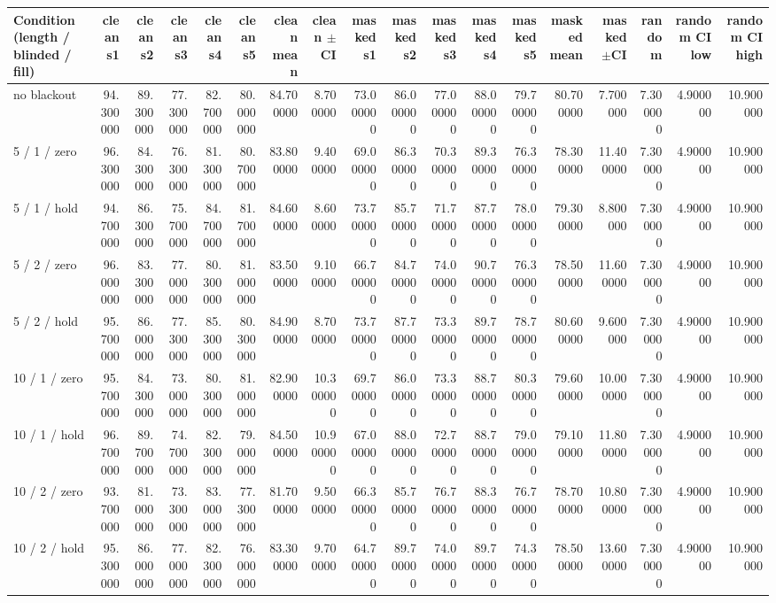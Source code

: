\begin{tabular}{lrrrrrrrrrrrrrrrrr}
\toprule
Condition (length / blinded / fill) & clean s1 & clean s2 & clean s3 & clean s4 & clean s5 & clean mean & clean $\pm$CI & masked s1 & masked s2 & masked s3 & masked s4 & masked s5 & masked mean & masked $\pm$CI & random & random CI low & random CI high \\
\midrule
no blackout & 94.300000 & 89.300000 & 77.300000 & 82.700000 & 80.000000 & 84.700000 & 8.700000 & 73.000000 & 86.000000 & 77.000000 & 88.000000 & 79.700000 & 80.700000 & 7.700000 & 7.300000 & 4.900000 & 10.900000 \\
5 / 1 / zero & 96.300000 & 84.300000 & 76.300000 & 81.300000 & 80.700000 & 83.800000 & 9.400000 & 69.000000 & 86.300000 & 70.300000 & 89.300000 & 76.300000 & 78.300000 & 11.400000 & 7.300000 & 4.900000 & 10.900000 \\
5 / 1 / hold & 94.700000 & 86.300000 & 75.700000 & 84.700000 & 81.700000 & 84.600000 & 8.600000 & 73.700000 & 85.700000 & 71.700000 & 87.700000 & 78.000000 & 79.300000 & 8.800000 & 7.300000 & 4.900000 & 10.900000 \\
5 / 2 / zero & 96.000000 & 83.300000 & 77.000000 & 80.300000 & 81.000000 & 83.500000 & 9.100000 & 66.700000 & 84.700000 & 74.000000 & 90.700000 & 76.300000 & 78.500000 & 11.600000 & 7.300000 & 4.900000 & 10.900000 \\
5 / 2 / hold & 95.700000 & 86.000000 & 77.300000 & 85.300000 & 80.300000 & 84.900000 & 8.700000 & 73.700000 & 87.700000 & 73.300000 & 89.700000 & 78.700000 & 80.600000 & 9.600000 & 7.300000 & 4.900000 & 10.900000 \\
10 / 1 / zero & 95.700000 & 84.300000 & 73.000000 & 80.300000 & 81.000000 & 82.900000 & 10.300000 & 69.700000 & 86.000000 & 73.300000 & 88.700000 & 80.300000 & 79.600000 & 10.000000 & 7.300000 & 4.900000 & 10.900000 \\
10 / 1 / hold & 96.700000 & 89.700000 & 74.700000 & 82.300000 & 79.000000 & 84.500000 & 10.900000 & 67.000000 & 88.000000 & 72.700000 & 88.700000 & 79.000000 & 79.100000 & 11.800000 & 7.300000 & 4.900000 & 10.900000 \\
10 / 2 / zero & 93.700000 & 81.000000 & 73.300000 & 83.000000 & 77.300000 & 81.700000 & 9.500000 & 66.300000 & 85.700000 & 76.700000 & 88.300000 & 76.700000 & 78.700000 & 10.800000 & 7.300000 & 4.900000 & 10.900000 \\
10 / 2 / hold & 95.300000 & 86.000000 & 77.000000 & 82.300000 & 76.000000 & 83.300000 & 9.700000 & 64.700000 & 89.700000 & 74.000000 & 89.700000 & 74.300000 & 78.500000 & 13.600000 & 7.300000 & 4.900000 & 10.900000 \\

\end{tabular}
